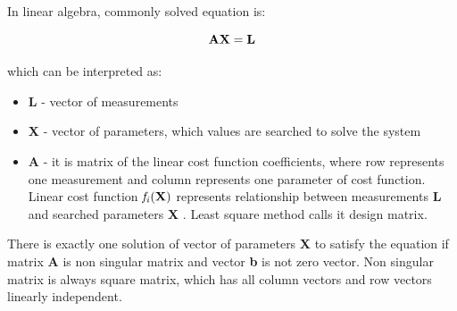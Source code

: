 \documentclass[a4paper,12pt]{article}
\newcommand{\ematr}[1]{
{\bf #1}
}
\newcommand{\evect}[1]{
{\bf #1}
}
\newcommand{\efunc}[1]{
{\it #1}
}
\newcommand{\term}[1]{
{\it #1}%
}
\begin{document}
In linear algebra, commonly solved equation is:

\begin{equation}
\label{eq:linear_eq}
\ematr{A}\evect{X} = \evect{L} 
\end{equation} 



which can be interpreted as:
\begin{itemize}
\item \evect{L} - vector of measurements
\item \evect{X} - vector of parameters, which values are searched to solve the system
\item \ematr{A} - it is matrix of the linear cost function  coefficients,  where row represents one measurement 
		  and column represents one parameter of cost function. Linear cost function $\efunc{f_{i}(\evect{X})}$
		  represents relationship between measurements \evect{L} and searched parameters \evect{X}. 
		  Least square method calls it design matrix. 
\end{itemize}


There is exactly one solution 
of vector of parameters  \evect{X} to satisfy the equation if matrix \ematr{A} is 
non singular matrix  and vector \evect{b} is not zero vector. Non singular matrix is always square matrix, 
which has all column vectors and row vectors linearly independent. 

\end{document}
